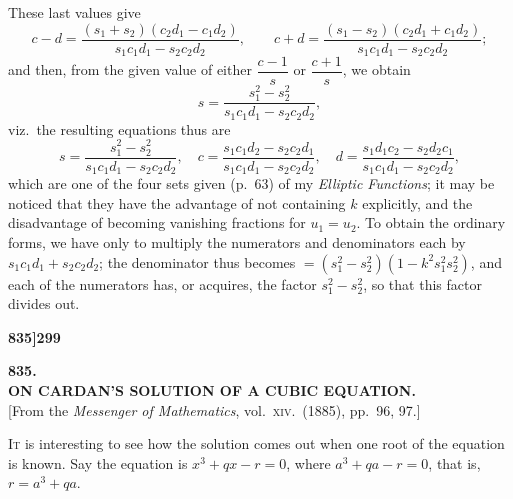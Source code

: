 \documentclass[11pt]{article}
\begin{document}
\noindent These last values give
\[
c - d = \frac{(s_{1} + s_{2})(c_{2}d_{1} - c_{1}d_{2})}{s_{1}c_{1}d_{1} - s_{2}c_{2}d_{2}},\qquad c + d = \frac{(s_{1} - s_{2})(c_{2}d_{1} + c_{1}d_{2})}{s_{1}c_{1}d_{1} - s_{2}c_{2}d_{2}};
\]
and then, from the given value of either $\dfrac{c - 1}{s}$ or $\dfrac{c + 1}{s}$, we obtain
\[
s = \frac{s_{1}^{2} - s_{2}^{2}}{s_{1}c_{1}d_{1} - s_{2}c_{2}d_{2}},
\]
viz.\ the resulting equations thus are
\[
s = \frac{s_{1}^{2} - s_{2}^{2}}{s_{1}c_{1}d_{1} - s_{2}c_{2}d_{2}},\quad c = \frac{s_{1}c_{1}d_{2} - s_{2}c_{2}d_{1}}{s_{1}c_{1}d_{1} - s_{2}c_{2}d_{2}},\quad d = \frac{s_{1}d_{1}c_{2} - s_{2}d_{2}c_{1}}{s_{1}c_{1}d_{1} - s_{2}c_{2}d_{2}},
\]
which are one of the four sets given (p.\ 63) of my \textit{Elliptic Functions}; it may be noticed that they have the advantage of not containing $k$ explicitly, and the disadvantage of becoming vanishing fractions for $u_{1} = u_{2}$. To obtain the ordinary forms, we have only to multiply the numerators and denominators each by $s_{1}c_{1}d_{1} + s_{2}c_{2}d_{2}$; the denominator thus becomes $= (s_{1}^{2} - s_{2}^{2})(1 - k^{2}s_{1}^{2}s_{2}^{2})$, and each of the numerators has, or acquires, the factor $s_{1}^{2} - s_{2}^{2}$, so that this factor divides out.


\newpage

\noindent\textbf{835]}\hfill\hfill\textbf{299}

\bigskip

\begin{center}
{\large\textbf{835.}}\\[0.7em]
{\large\textbf{ON CARDAN'S SOLUTION OF A CUBIC EQUATION.}}\\[1em]
{\small [From the \textit{Messenger of Mathematics}, vol.\ \textsc{xiv}.\ (1885), pp.\ 96, 97.]}
\end{center}

\bigskip

\noindent \textsc{It} is interesting to see how the solution comes out when one root of the equation is known. Say the equation is $x^{3} + qx - r = 0$, where $a^{3} + qa - r = 0$, that is, $r = a^{3} + qa$.

\medskip
\end{document}
